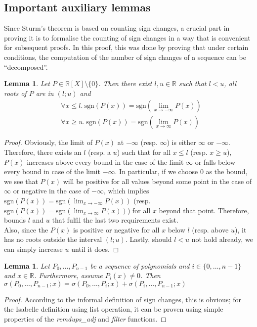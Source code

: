 \documentclass[11pt,a4paper,oneside]{article}
\newtheorem{lemma}[definition]{Lemma}
\newcommand{\RR}{\mathbb{R}}
\newcommand{\sgn}{\mathrm{sgn}}
\begin{document}
\subsection{Important auxiliary lemmas}
\label{sec:aux_lemmas}

Since Sturm's theorem is based on counting sign changes, a crucial part in proving it is to formalise the counting of sign changes in a way that is convenient for subsequent proofs. In this proof, this was done by proving that under certain conditions, the computation of the number of sign changes of a sequence can be \enquote{decomposed}.

\begin{lemma}\label{thm:limits}
Let $P\in\RR[X]\setminus\{0\}$. Then there exist $l,u\in\RR$ such that $l<u$, all roots of $P$ are in $(l;u)$ and
\begin{align*}
&\forall x\leq l.\ \sgn(P(x)) = \sgn\left(\lim\limits_{x\to -\infty} P(x)\right)\\
&\forall x\geq u.\ \sgn(P(x)) = \sgn\left(\lim\limits_{x\to \infty} P(x)\right)
\end{align*}
\end{lemma}
\begin{proof}
Obviously, the limit of $P(x)$ at $-\infty$ (resp. $\infty$) is either $\infty$ or $-\infty$. Therefore, there exists an $l$ (resp. a $u$) such that for all $x\leq l$ (resp. $x\geq u$), $P(x)$ increases above every bound in the case of the limit $\infty$ or falls below every bound in case of the limit $-\infty$. In particular, if we choose 0 as the bound, we see that $P(x)$ will be positive for all values beyond some point in the case of $\infty$ or negative in the case of $-\infty$, which implies $\sgn(P(x)) = \sgn(\lim_{x\to -\infty} P(x))$ (resp. $\sgn(P(x)) = \sgn(\lim_{x\to \infty} P(x))$) for all $x$ beyond that point. Therefore, bounds $l$ and $u$ that fulfil the last two requirements exist.\\
Also, since the $P(x)$ is positive or negative for all $x$ below $l$ (resp. above $u$), it has no roots outside the interval $(l;u)$. Lastly, should $l<u$ not hold already, we can simply increase $u$ until it does.
\end{proof}\vskip3mm

\begin{lemma}\label{thm:sign_changes_distrib}
Let $P_0, \ldots, P_{n-1}$ be a sequence of polynomials and $i\in\{0,\ldots,n-1\}$ and $x\in\RR$. Furthermore, assume $P_i(x) \neq 0$. Then $\sigma(P_0,\ldots,P_{n-1}; x) = \sigma(P_0,\ldots,P_i; x)+\sigma(P_i,\ldots,P_{n-1}; x)$
\end{lemma}
\begin{proof}
According to the informal definition of sign changes, this is obvious; for the Isabelle definition using list operation, it can be proven using simple properties of the \emph{remdups\_adj} and \emph{filter} functions.
\end{proof}\vskip3mm
\end{document}
